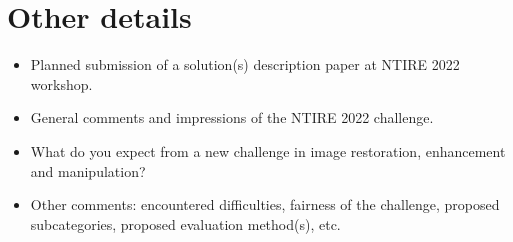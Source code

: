 \documentclass[10pt,twocolumn,letterpaper]{article}
\begin{document}

\section{Other details}
\begin{itemize}
\item Planned submission of a solution(s) description paper at NTIRE 2022 workshop.
\item General comments and impressions of the NTIRE 2022 challenge. 
\item What do you expect from a new challenge in image restoration, enhancement and manipulation?
\item Other comments: encountered difficulties, fairness of the challenge, proposed subcategories, proposed evaluation method(s), etc.
\end{itemize}

{\small


}
\end{document}
